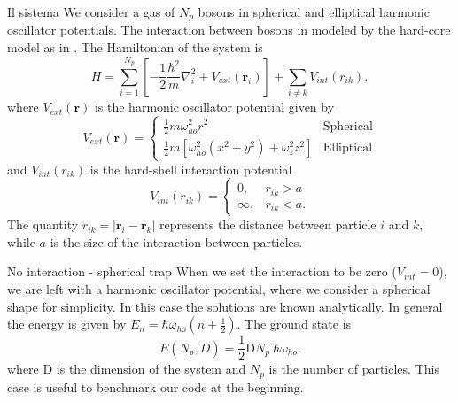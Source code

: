 \documentclass[10pt]{beamer}
\begin{document}
\begin{frame}{Il sistema}
We consider a gas of $N_p$ bosons in spherical and elliptical harmonic oscillator potentials. The interaction between bosons in modeled by the hard-core model as in \cite{vmcarticle}. %
The Hamiltonian of the system is 
\begin{equation}
H = \sum_{i=1}^{N_p}\left[ -\frac{1}{2}\frac{\hbar^2}{m}\nabla_i^2 + V_{ext}(\textbf{r}_i) \right]+ \sum_{i \neq k} V_{int}(r_{ik}),
\label{eq_hamilton}
\end{equation}
where $V_{ext}(\textbf{r})$ is the harmonic oscillator potential given by
\begin{equation*}
V_{ext}(\textbf{r})=\begin{cases}
\frac{1}{2}m\omega_{ho}^2r^2 &\text{Spherical}\\
\frac{1}{2}m\left[ \omega_{ho}^2 \left(x^2 + y^2 \right) + \omega_z^2 z^2\right] &\text{Elliptical}
\end{cases}
\end{equation*}
and $V_{int}(r_{ik})$ is the hard-shell interaction potential 
\begin{equation*}
V_{int}(r_{ik}) = \begin{cases}
0, & r_{ik} > a \\
\infty, & r_{ik} < a.
\end{cases}
\end{equation*}
The quantity $r_{ik} = |\textbf{r}_i-\textbf{r}_k|$ represents the distance between particle $i$ and $k$, while $a$ is the size of the interaction between particles. 
\end{frame}

\begin{frame}[fragile]{No interaction - spherical trap}
	When we set the interaction to be zero ($V_{int}=0$), we are left with a harmonic oscillator potential, where we consider a spherical shape for simplicity. In this case the solutions are known analytically. In general the energy is given by $E_n=\hbar\omega_{ho}(n+\frac{1}{2})$. The ground state is 
	\begin{equation*}
	E(N_p,D) = \frac{1}{2}\text{D} N_p\ \hbar\omega_{ho}.
	\label{analitica}
	\end{equation*}
	where D is the dimension of the system and $N_p$ is the number of particles. This case is useful to benchmark our code at the beginning.
\end{frame} 
\end{document}
